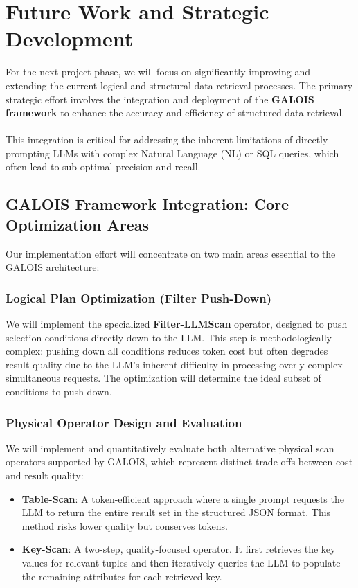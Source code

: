\section{Future Work and Strategic Development}
\label{sec:future_work}

For the next project phase, we will focus on significantly improving and extending the current logical and structural data retrieval processes. The primary strategic effort involves the integration and deployment of the \textbf{GALOIS framework} to enhance the accuracy and efficiency of structured data retrieval.
\\\\
This integration is critical for addressing the inherent limitations of directly prompting LLMs with complex Natural Language (NL) or SQL queries, which often lead to sub-optimal precision and recall.

\vspace{2em}
\subsection{GALOIS Framework Integration: Core Optimization Areas}

Our implementation effort will concentrate on two main areas essential to the GALOIS architecture:

\subsubsection{Logical Plan Optimization (Filter Push-Down)}
\label{sec:logical_plan}

We will implement the specialized \textbf{Filter-LLMScan} operator, designed to push selection conditions directly down to the LLM. This step is methodologically complex: pushing down all conditions reduces token cost but often degrades result quality due to the LLM's inherent difficulty in processing overly complex simultaneous requests. The optimization will determine the ideal subset of conditions to push down.

\subsubsection{Physical Operator Design and Evaluation}

We will implement and quantitatively evaluate both alternative physical scan operators supported by GALOIS, which represent distinct trade-offs between cost and result quality:

\begin{itemize}[leftmargin=*, label=$\diamond$]
    \item \textbf{Table-Scan}: A token-efficient approach where a single prompt requests the LLM to return the entire result set in the structured JSON format. This method risks lower quality but conserves tokens.
    \item \textbf{Key-Scan}: A two-step, quality-focused operator. It first retrieves the key values for relevant tuples and then iteratively queries the LLM to populate the remaining attributes for each retrieved key.
\end{itemize}


